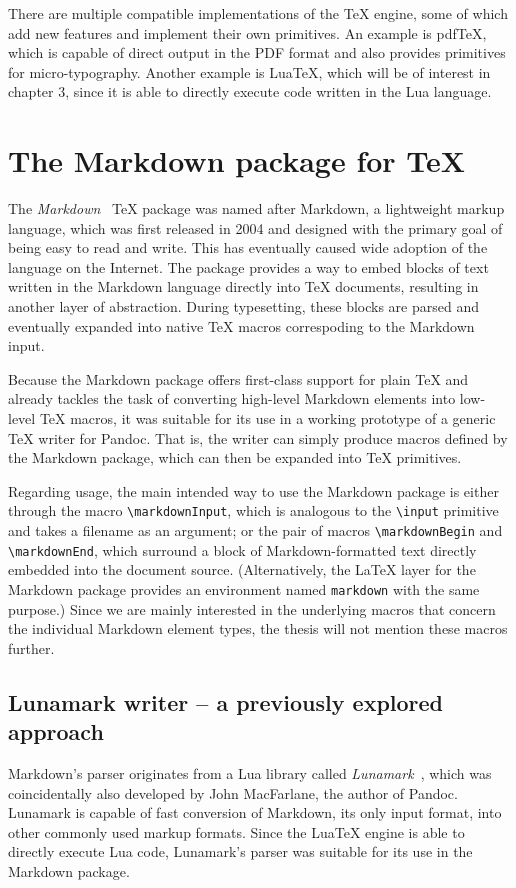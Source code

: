 \documentclass[
  digital,     %
  oneside,     %
  nosansbold,  %
  nocolorbold, %
  lof,         %
  nolot,       %
]{fithesis4}
\newcommand\macro[1]{\texttt{\textbackslash{}{#1}}}
\begin{document}
There are multiple compatible implementations of the \TeX{} engine, some of which add new features and implement their own primitives. An example is pdf\TeX{}, which is capable of direct output in the PDF format and also provides primitives for micro-typography. Another example is Lua\TeX{}, which will be of interest in chapter 3, since it is able to directly execute code written in the Lua language.

\section{The Markdown package for \TeX{}}
The \emph{Markdown}~\cite{cstug-markdown} \TeX{} package was named after Markdown, a lightweight markup language, which was first released in 2004 and designed with the primary goal of being easy to read and write. This has eventually caused wide adoption of the language on the Internet. The package provides a way to embed blocks of text written in the Markdown language directly into \TeX{} documents, resulting in another layer of abstraction. During typesetting, these blocks are parsed and eventually expanded into native \TeX{} macros correspoding to the Markdown input. 

Because the Markdown package offers first-class support for plain \TeX{} and already tackles the task of converting high-level Markdown elements into low-level \TeX{} macros, it was suitable for its use in a working prototype of a generic \TeX{} writer for Pandoc. That is, the writer can simply produce macros defined by the Markdown package, which can then be expanded into \TeX{} primitives.

Regarding usage, the main intended way to use the Markdown package is either through the macro \macro{markdownInput}, which is analogous to the \macro{input} primitive and takes a filename as an argument; or the pair of macros \macro{markdownBegin} and \macro{markdownEnd}, which surround a block of Markdown-formatted text directly embedded into the document source. (Alternatively, the \LaTeX{} layer for the Markdown package provides an environment named \texttt{markdown} with the same purpose.) Since we are mainly interested in the underlying macros that concern the individual Markdown element types, the thesis will not mention these macros further.

\subsection{Lunamark writer -- a previously explored approach}
Markdown's parser originates from a Lua library called \emph{Lunamark}~\cite{lunamark}, which was coincidentally also developed by John MacFarlane, the author of Pandoc. Lunamark is capable of fast conversion of Markdown, its only input format, into other commonly used markup formats. Since the Lua\TeX{} engine is able to directly execute Lua code, Lunamark's parser was suitable for its use in the Markdown package.
\end{document}
